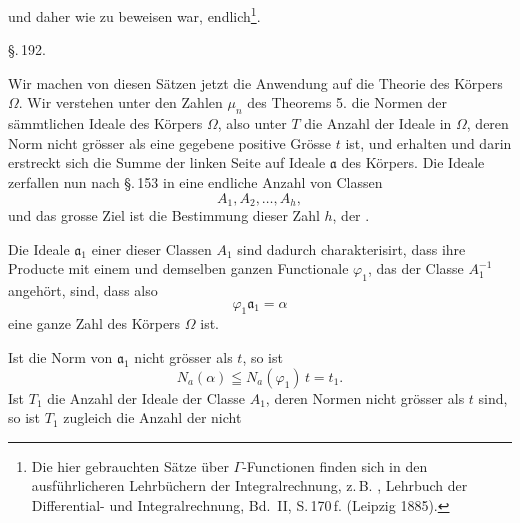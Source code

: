 und daher
wie zu beweisen war, endlich\footnote{Die hier gebrauchten Sätze über $\Gamma$-Functionen finden sich in den ausführlicheren Lehrbüchern der Integralrechnung, z.\,B. , Lehrbuch der Differential- und Integralrechnung, Bd.\ II, S.\,170\,f. (Leipzig 1885).}.

\begin{center}
\S.\,192.\\[4pt]
\end{center}

Wir machen von diesen Sätzen jetzt die Anwendung auf die Theorie des Körpers $\Omega$. Wir verstehen unter den Zahlen $\mu_n$ des Theorems 5. die Normen der sämmtlichen Ideale des Körpers $\Omega$, also unter $T$ die Anzahl der Ideale in $\Omega$, deren Norm nicht grösser als eine gegebene positive Grösse $t$ ist, und erhalten
und darin erstreckt sich die Summe der linken Seite auf  Ideale $\mathfrak{a}$ des Körpers. Die Ideale zerfallen nun nach \S.\,153 in eine endliche Anzahl von Classen
\[
A_1, A_2, \ldots, A_h,
\]
und das grosse Ziel ist die Bestimmung dieser Zahl $h$, der .

Die Ideale $\mathfrak{a}_1$ einer dieser Classen $A_1$ sind dadurch charakterisirt, dass ihre Producte mit einem und demselben ganzen Functionale $\varphi_1$, das der Classe $A_1^{-1}$ angehört,  sind, dass also
\[
\varphi_1 \mathfrak{a}_1 = \alpha
\]
eine ganze Zahl des Körpers $\Omega$ ist.

Ist die Norm von $\mathfrak{a}_1$ nicht grösser als $t$, so ist
\[
N_a(\alpha) \leqq N_a(\varphi_1)\, t = t_1.
\]
Ist $T_1$ die Anzahl der Ideale der Classe $A_1$, deren Normen nicht grösser als $t$ sind, so ist $T_1$ zugleich die Anzahl der nicht
